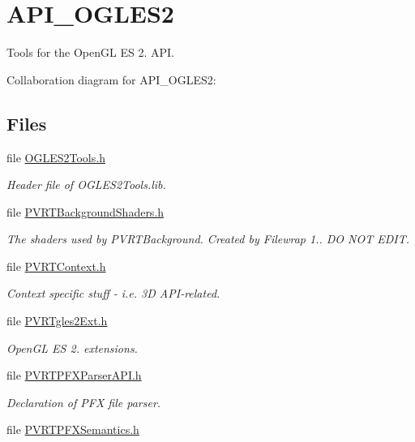 \hypertarget{group___a_p_i___o_g_l_e_s2}{\section{A\+P\+I\+\_\+\+O\+G\+L\+E\+S2}
\label{group___a_p_i___o_g_l_e_s2}
}


Tools for the Open\+G\+L E\+S 2. A\+P\+I.  


Collaboration diagram for A\+P\+I\+\_\+\+O\+G\+L\+E\+S2\+:
\subsection*{Files}
\begin{DoxyCompactItemize}
\item 
file \hyperlink{_o_g_l_e_s2_tools_8h}{O\+G\+L\+E\+S2\+Tools.\+h}
\begin{DoxyCompactList}\small\item\em Header file of O\+G\+L\+E\+S2\+Tools.\+lib. \end{DoxyCompactList}\item 
file \hyperlink{_p_v_r_t_background_shaders_8h}{P\+V\+R\+T\+Background\+Shaders.\+h}
\begin{DoxyCompactList}\small\item\em The shaders used by P\+V\+R\+T\+Background. Created by Filewrap 1.. D\+O N\+O\+T E\+D\+I\+T. \end{DoxyCompactList}\item 
file \hyperlink{_2_p_v_r_t_context_8h}{P\+V\+R\+T\+Context.\+h}
\begin{DoxyCompactList}\small\item\em Context specific stuff -\/ i.\+e. 3\+D A\+P\+I-\/related. \end{DoxyCompactList}\item 
file \hyperlink{_p_v_r_tgles2_ext_8h}{P\+V\+R\+Tgles2\+Ext.\+h}
\begin{DoxyCompactList}\small\item\em Open\+G\+L E\+S 2. extensions. \end{DoxyCompactList}\item 
file \hyperlink{_p_v_r_t_p_f_x_parser_a_p_i_8h}{P\+V\+R\+T\+P\+F\+X\+Parser\+A\+P\+I.\+h}
\begin{DoxyCompactList}\small\item\em Declaration of P\+F\+X file parser. \end{DoxyCompactList}\item 
file \hyperlink{_p_v_r_t_p_f_x_semantics_8h}{P\+V\+R\+T\+P\+F\+X\+Semantics.\+h}

\end{DoxyCompactItemize}
